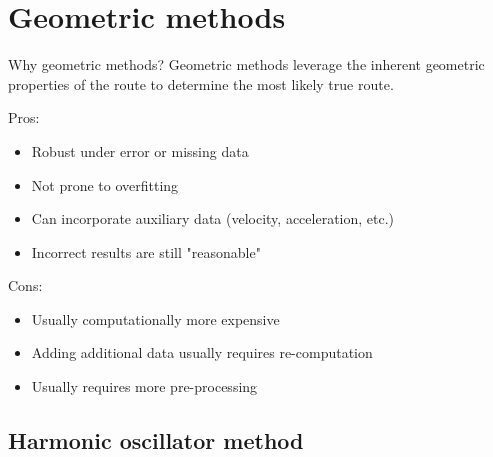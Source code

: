 \documentclass[aspectratio=169, bigfiles, professionalfonts, hyperref={colorlinks=true, allcolors=., urlcolor=blue}]{beamer}
\begin{document}
\section{Geometric methods}

\begin{frame}{Why geometric methods?}
	Geometric methods leverage the inherent geometric properties of the route to determine the most likely true route.\\[3em]
\noindent\begin{minipage}[t]{.49\textwidth}
    \begin{tcolorbox}[colframe=yellow,
    colback=yellow!10!white,
    colbacktitle=yellow!40!white,
    coltitle=black, fonttitle=\bfseries]
	Pros:
\begin{itemize}
	\item Robust under error or missing data
	\item Not prone to overfitting
	\item Can incorporate auxiliary data (velocity, acceleration, etc.)
	\item Incorrect results are still "reasonable"
\end{itemize}
\end{tcolorbox}
\end{minipage}\hfill
\noindent\begin{minipage}[t]{.49\textwidth}
    \begin{tcolorbox}[colframe=yellow,
    colback=yellow!10!white,
    colbacktitle=yellow!40!white,
    coltitle=black, fonttitle=\bfseries]
Cons:
\begin{itemize}
	\item Usually computationally more expensive
	\item Adding additional data usually requires re-computation
	\item Usually requires more pre-processing
\end{itemize}
\vspace{4mm}
\end{tcolorbox}
\end{minipage}
\end{frame}

\subsection{Harmonic oscillator method}
\end{document}
